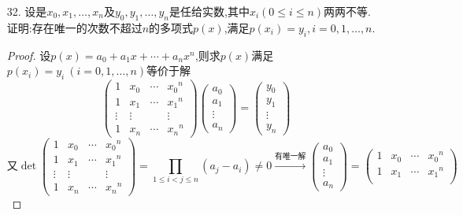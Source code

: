 \documentclass{article}
\begin{document}
\begin{enumerate}
\begin{enumerate}
    \end{enumerate}
    \item [32.]设是$x_0,x_1,\ldots,x_n$及$y_0,y_1,\ldots,y_n$是任给实数,其中$x_i(0\leqslant i \leqslant n)$两两不等.
    证明:存在唯一的次数不超过$n$的多项式$p(x)$,满足$p(x_i)=y_i,i=0,1,\ldots,n$.
    \begin{proof}
    设$p(x)=a_0 + a_1 x + \cdots + a_n x^n $,则求$p(x)$满足$p(x_i)=y_i\ (i=0,1,\ldots,n)$等价于解
    \[
        \begin{pmatrix}
            1 & x_0 & \cdots & {x_0}^n\\
            1 & x_1 & \cdots & {x_1}^n\\
            \vdots & \vdots & &\vdots \\
            1 & x_n & \cdots & {x_n}^n
        \end{pmatrix}
        \begin{pmatrix}
            a_0\\
            a_1\\
            \vdots\\
            a_n
        \end{pmatrix}
        =
        \begin{pmatrix}
            y_0\\
            y_1\\
            \vdots\\
            y_n 
        \end{pmatrix}
    \]
    \[
        \mbox{又}\det
        \begin{pmatrix}
            1 & x_0 & \cdots & {x_0}^n\\
            1 & x_1 & \cdots & {x_1}^n\\
            \vdots & \vdots & &\vdots \\
            1 & x_n & \cdots & {x_n}^n
        \end{pmatrix}
        =\displaystyle{\prod\limits_{1\leqslant i<j\leqslant n} (a_j-a_i)}\neq 0
        \xrightarrow{\mbox{有唯一解}}
        \begin{pmatrix}
            a_0\\
            a_1\\
            \vdots\\
            a_n
        \end{pmatrix}
        =
        {\begin{pmatrix}
            1 & x_0 & \cdots & {x_0}^n\\
            1 & x_1 & \cdots & {x_1}^n\\

\end{pmatrix}}\]
\end{proof}
\end{enumerate}
\end{document}
